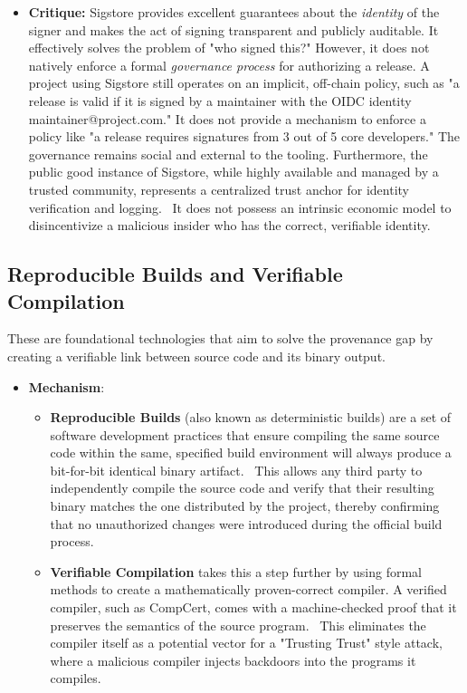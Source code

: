 \documentclass{article}
\begin{document}
\begin{itemize}
\item \textbf{Critique:} Sigstore provides excellent guarantees about the \emph{identity} of the signer and makes the act of signing transparent and publicly auditable. It effectively solves the problem of "who signed this?" However, it does not natively enforce a formal \emph{governance process} for authorizing a release. A project using Sigstore still operates on an implicit, off-chain policy, such as "a release is valid if it is signed by a maintainer with the OIDC identity maintainer@project.com." It does not provide a mechanism to enforce a policy like "a release requires signatures from 3 out of 5 core developers." The governance remains social and external to the tooling. Furthermore, the public good instance of Sigstore, while highly available and managed by a trusted community, represents a centralized trust anchor for identity verification and logging.~\cite{newman2022sigstore} It does not possess an intrinsic economic model to disincentivize a malicious insider who has the correct, verifiable identity.
\end{itemize}

\subsection{Reproducible Builds and Verifiable Compilation}

These are foundational technologies that aim to solve the provenance gap by creating a verifiable link between source code and its binary output.

\begin{itemize}
\item \textbf{Mechanism}:

\begin{itemize}
\item \textbf{Reproducible Builds} (also known as deterministic builds) are a set of software development practices that ensure compiling the same source code within the same, specified build environment will always produce a bit-for-bit identical binary artifact.~\cite{lamb2022reproducible} This allows any third party to independently compile the source code and verify that their resulting binary matches the one distributed by the project, thereby confirming that no unauthorized changes were introduced during the official build process.~\cite{lamb2022reproducible}
\item \textbf{Verifiable Compilation} takes this a step further by using formal methods to create a mathematically proven-correct compiler. A verified compiler, such as CompCert, comes with a machine-checked proof that it preserves the semantics of the source program.~\cite{leroy2009compcert} This eliminates the compiler itself as a potential vector for a "Trusting Trust" style attack, where a malicious compiler injects backdoors into the programs it compiles.
\end{itemize}
\end{itemize}
\end{document}
